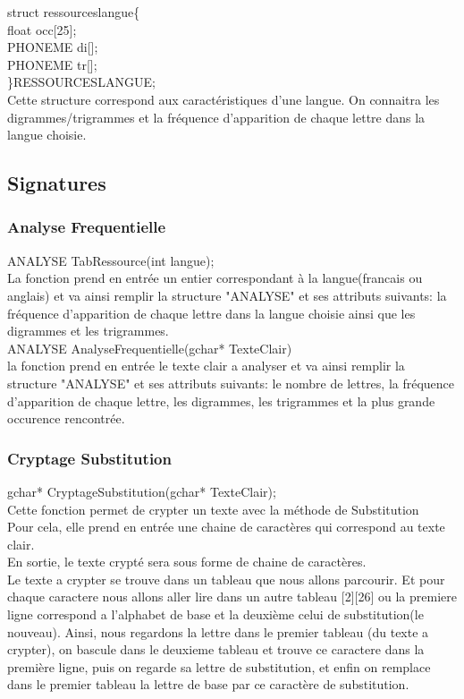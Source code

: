 \documentclass[a4]{article}
\begin{document}
	struct ressourceslangue\{ \\
		float occ[25];\\
		PHONEME di[];\\
		PHONEME tr[];\\
	\}RESSOURCESLANGUE;\\
	Cette structure correspond aux caractéristiques d'une langue. On connaitra
	les digrammes/trigrammes et la fréquence d'apparition de chaque lettre dans la langue choisie.
		\subsection{Signatures}
		
	
	\subsubsection{Analyse Frequentielle}
	ANALYSE TabRessource(int langue);\\
		La fonction prend en entrée un entier correspondant à la langue(francais ou anglais)
		et va ainsi remplir la structure "ANALYSE" et ses attributs suivants:
		la fréquence d'apparition de chaque lettre dans la langue choisie ainsi que les digrammes
		et les trigrammes.\\
		
		
		
	ANALYSE AnalyseFrequentielle(gchar* TexteClair)\\
		la fonction prend en entrée le texte clair a analyser et va ainsi remplir la structure "ANALYSE" et 
		ses attributs suivants:
		le nombre de lettres, la fréquence d'apparition de chaque lettre, les digrammes, les trigrammes
		et la plus grande occurence rencontrée.\\
		
	\subsubsection{Cryptage Substitution}
	gchar* CryptageSubstitution(gchar* TexteClair);\\
		Cette fonction permet de crypter un texte avec la méthode de Substitution\\
		Pour cela, elle prend en entrée une chaine de caractères qui correspond au texte clair.\\
		En sortie, le texte crypté sera sous forme de chaine de caractères.\\
		Le texte a crypter se trouve dans un tableau que nous allons parcourir. Et pour chaque caractere 
		nous allons aller lire dans un autre tableau [2][26] ou la premiere ligne correspond a l'alphabet
		de base et la deuxième celui de substitution(le nouveau). Ainsi, nous regardons la lettre dans 
		le premier tableau (du texte a crypter), on bascule dans le deuxieme tableau et trouve ce caractere dans la
		première ligne, puis on regarde sa lettre de substitution, et enfin on remplace dans le premier tableau 
		la lettre de base par ce caractère de substitution.
		
\end{document}
